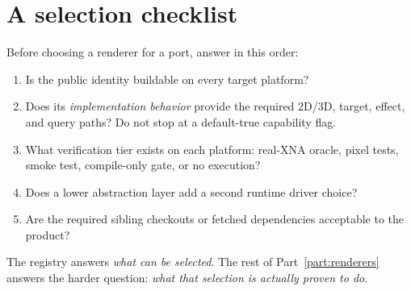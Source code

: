 \section{A selection checklist}

Before choosing a renderer for a port, answer in this order:

\begin{enumerate}
  \item Is the public identity buildable on every target platform?
  \item Does its \emph{implementation behavior} provide the required 2D/3D, target, effect, and
    query paths? Do not stop at a default-true capability flag.
  \item What verification tier exists on each platform: real-XNA oracle, pixel tests, smoke test,
    compile-only gate, or no execution?
  \item Does a lower abstraction layer add a second runtime driver choice?
  \item Are the required sibling checkouts or fetched dependencies acceptable to the product?
\end{enumerate}

The registry answers \emph{what can be selected}. The rest of Part~\ref{part:renderers} answers the harder
question: \emph{what that selection is actually proven to do}.
